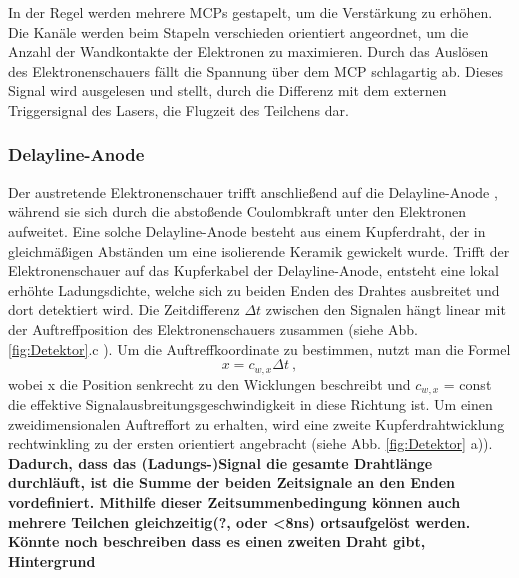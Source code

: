 In der Regel werden mehrere MCPs gestapelt, um die Verstärkung zu erhöhen. Die Kanäle werden beim Stapeln verschieden orientiert angeordnet, um die Anzahl der Wandkontakte der Elektronen zu maximieren. %
Durch das Auslösen des Elektronenschauers fällt die Spannung über dem MCP schlagartig ab. Dieses Signal wird ausgelesen und stellt, durch die Differenz mit dem externen Triggersignal des Lasers, die Flugzeit des Teilchens dar. 



\subsubsection{Delayline-Anode}

Der austretende Elektronenschauer trifft anschließend auf die Delayline-Anode \cite{sobottka1988}, während sie sich durch die abstoßende Coulombkraft unter den Elektronen aufweitet. Eine solche Delayline-Anode besteht aus einem Kupferdraht, der in gleichmäßigen Abständen um eine isolierende Keramik gewickelt wurde. Trifft der Elektronenschauer auf das Kupferkabel der Delayline-Anode, entsteht eine lokal erhöhte Ladungsdichte, welche sich zu beiden Enden des Drahtes ausbreitet und dort detektiert wird. Die Zeitdifferenz $\Delta t$ zwischen den Signalen hängt linear mit der Auftreffposition des Elektronenschauers zusammen (siehe Abb. \ref{fig:Detektor}.c ). Um die Auftreffkoordinate zu bestimmen, nutzt man die Formel
\begin{equation}
x = c_{w,x} \Delta t\ ,
\end{equation}
wobei x die Position senkrecht zu den Wicklungen beschreibt und $c_{w,x}$ = const die effektive Signalausbreitungsgeschwindigkeit in diese Richtung ist. Um einen zweidimensionalen Auftreffort zu erhalten, wird eine zweite Kupferdrahtwicklung rechtwinkling zu der ersten orientiert angebracht (siehe Abb. \ref{fig:Detektor} a)). \textbf{Dadurch, dass das (Ladungs-)Signal die gesamte Drahtlänge durchläuft, ist die Summe der beiden Zeitsignale an den Enden vordefiniert. Mithilfe dieser Zeitsummenbedingung können auch mehrere Teilchen gleichzeitig(?, oder <8ns) ortsaufgelöst werden.}\\
\textbf{Könnte noch beschreiben dass es einen zweiten Draht gibt, Hintergrund}

